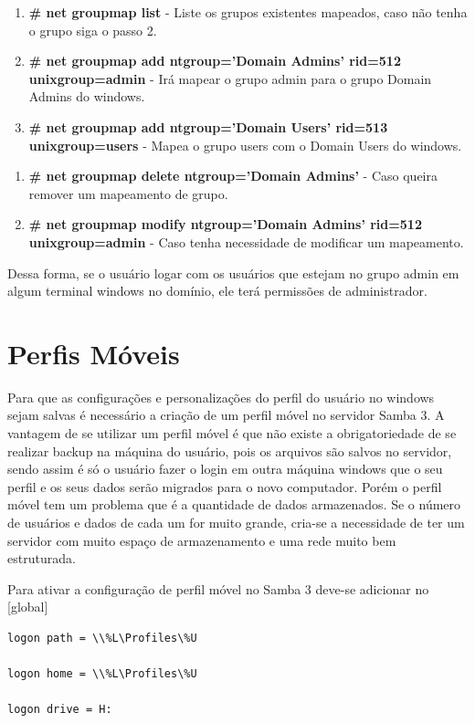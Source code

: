 \clearpage

\begin{enumerate}
	\item \textbf{\# net groupmap list} - Liste os grupos existentes mapeados, caso não tenha o grupo siga o passo 2.		
	\item \textbf{\# net groupmap add ntgroup='Domain Admins' rid=512 unixgroup=admin} - Irá mapear o grupo admin para o grupo Domain Admins do windows.
	\item \textbf{\# net groupmap add ntgroup='Domain Users' rid=513 unixgroup=users} - Mapea o grupo users com o Domain Users do windows.
\end{enumerate}

\begin{enumerate}
	\item \textbf{\# net groupmap delete ntgroup='Domain Admins'} - Caso queira remover um mapeamento de grupo.
	\item \textbf{\# net groupmap modify ntgroup='Domain Admins' rid=512 unixgroup=admin} - Caso tenha necessidade de modificar um mapeamento.
\end{enumerate}

Dessa forma, se o usuário logar com os usuários que estejam no grupo admin em algum terminal windows no domínio, ele terá permissões de administrador.

\section{Perfis Móveis}

Para que as configurações e personalizações do perfil do usuário no windows sejam salvas é necessário a criação de um perfil móvel no servidor Samba 3. 
A vantagem de se utilizar um perfil móvel é que não existe a obrigatoriedade de se realizar backup na máquina do usuário, pois os arquivos são salvos no servidor, sendo assim é só o usuário fazer o login em outra máquina windows que o seu perfil e os seus dados serão migrados para o novo computador. Porém o perfil móvel tem um problema que é a quantidade de dados armazenados. Se o número de usuários e dados de cada um for muito grande, cria-se a necessidade de ter um servidor com muito espaço de armazenamento e uma rede muito bem estruturada. 

Para ativar a configuração de perfil móvel no Samba 3 deve-se adicionar no [global]\\

\begin{lstlisting}	
logon path = \\%L\Profiles\%U

logon home = \\%L\Profiles\%U

logon drive = H:	
\end{lstlisting}


